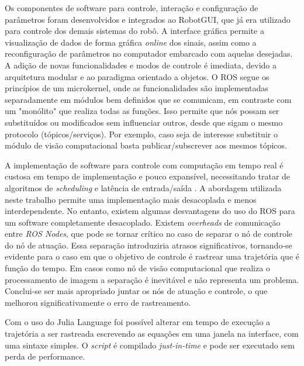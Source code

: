 Os componentes de software para controle, interação e configuração de parâmetros foram desenvolvidos e integrados ao RobotGUI, que já era utilizado para controle dos demais sistemas do robô. A interface gráfica permite a visualização de dados de forma gráfica \textit{online} dos sinais, assim como a reconfiguração de parâmetros no computador embarcado com aquelas desejadas. A adição de novas funcionalidades e modos de controle é imediata, devido a arquitetura modular e ao paradigma orientado a objetos. O ROS segue os princípios de um microkernel, onde as funcionalidades são implementadas separadamente em módulos bem definidos que se comunicam, em contraste com um "monólito" que realiza todas as funções. Isso permite que nós possam ser substituídos ou modificados sem influenciar outros, desde que sigam o mesmo protocolo (tópicos/serviços). Por exemplo, caso seja de interesse substituir o módulo de visão computacional basta publicar/subscrever aos mesmos tópicos.

A implementação de software para controle com computação em tempo real é custosa em tempo de implementação e pouco expansível, necessitando tratar de algoritmos de \textit{scheduling} e latência de entrada/saída \citep{nilsson1998real}. A abordagem utilizada neste trabalho permite uma implementação mais desacoplada e menos interdependente. No entanto, existem algumas desvantagens do uso do ROS para um software completamente desacoplado. Existem \textit{overheads} de comunicação entre \textit{ROS Nodes}, que pode se tornar crítico no caso de separar o nó de controle do nó de atuação. Essa separação introduziria atrasos significativos, tornando-se evidente para o caso em que o objetivo de controle é rastrear uma trajetória que é função do tempo. Em casos como nó de visão computacional que realiza o processamento de imagem a separação é inevitável e não representa um problema. Conclui-se ser mais apropriado juntar os nós de atuação e controle, o que melhorou significativamente o erro de rastreamento. %

Com o uso do Julia Language foi possível alterar em tempo de execução a trajetória a ser rastreada escrevendo as equações em uma janela na interface, com uma sintaxe simples. O \textit{script} é compilado \textit{just-in-time} e pode ser executado sem perda de performance.

